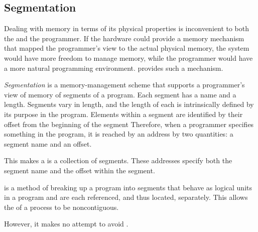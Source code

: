 \subsection{Segmentation}\label{subsec:Segmentation}
Dealing with memory in terms of its physical properties is inconvenient to both the  and the programmer.
If the hardware could provide a memory mechanism that mapped the programmer’s view to the actual physical memory, the system would have more freedom to manage memory, while the programmer would have a more natural programming environment.
 provides such a mechanism.

\begin{definition}[Segmentation]\label{def:Segmentation}
  \emph{Segmentation} is a memory-management scheme that supports a programmer's view of memory of segments of a program.
  Each segment has a name and a length.
  Segments vary in length, and the length of each is intrinsically defined by its purpose in the program.
  Elements within a segment are identified by their offset from the beginning of the segment
  Therefore, when a programmer specifies something in the program, it is reached by an address by two quantities: a segment name and an offset.

  This makes a  is a collection of segments.
  These addresses specify both the segment name and the offset within the segment.

  \begin{remark}\label{rmk:Segmentation_Memory_Locations}
     is a method of breaking up a program into segments that behave as logical units in a program and are each referenced, and thus located, separately.
    This allows the  of a process to be noncontiguous.

    However, it makes no attempt to avoid .
  \end{remark}
\end{definition}

